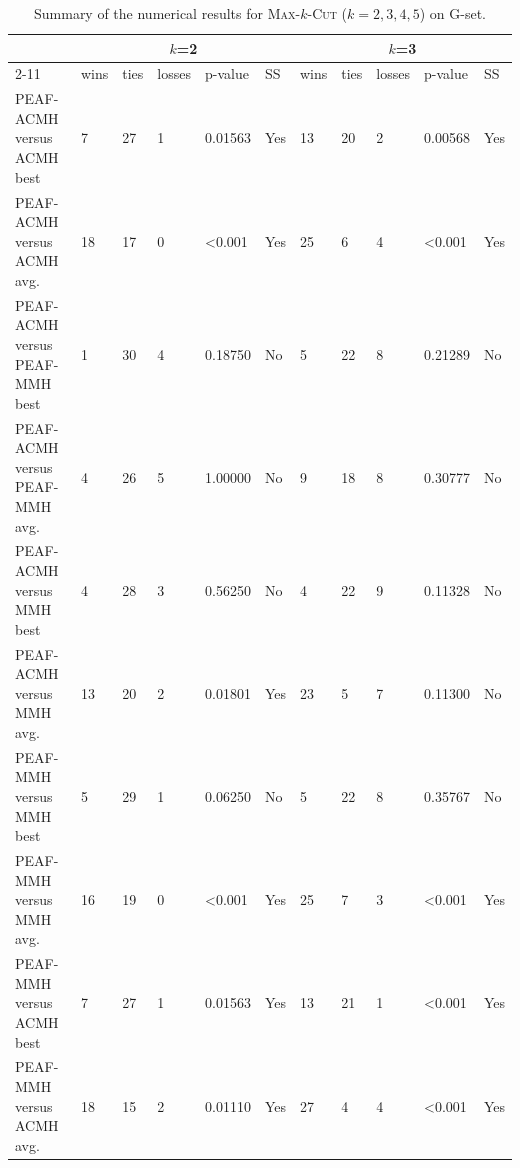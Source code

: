 \documentclass[12pt, a4paper]{article}%
\renewcommand{\arraystretch}{1.3}
\numberwithin{equation}{section}
\theoremstyle{plain}
\begin{document}
				
				{
					\scriptsize
					\setlength{\tabcolsep}{10pt}
					\renewcommand{\arraystretch}{1.6}
					\begin{landscape}
						\begin{longtable}{|l|lllll|lllll|}
							\caption[Summary for \textsc{Max}-$k$-\textsc{Cut}]{Summary of the numerical results for \textsc{Max}-$k$-\textsc{Cut} ($k=2,3,4,5$) on G-set.}
							\label{tab::maxcut-summary}\\
							\hline
							\multicolumn{1}{|c|}{\multirow{2}{*}{}} & \multicolumn{5}{c|}{$k$=2}                    & \multicolumn{5}{c|}{$k$=3}                    \\ \cline{2-11} 
							\multicolumn{1}{|c|}{}                  & wins & ties & losses & p-value          & SS  & wins & ties & losses & p-value          & SS  \\ \hline
							PEAF-ACMH versus ACMH best             & 7    & 27   & 1      & 0.01563          & Yes & 13   & 20   & 2      & 0.00568          & Yes \\
							PEAF-ACMH versus ACMH avg.             & 18   & 17   & 0      & \textless{}0.001 & Yes & 25   & 6    & 4      & \textless{}0.001 & Yes \\
							PEAF-ACMH versus PEAF-MMH best           & 1    & 30   & 4      & 0.18750          & No  & 5    & 22   & 8      & 0.21289          & No  \\
							PEAF-ACMH versus PEAF-MMH avg.           & 4    & 26   & 5      & 1.00000          & No  & 9    & 18   & 8      & 0.30777          & No  \\
							PEAF-ACMH versus MMH best               & 4    & 28   & 3      & 0.56250          & No  & 4    & 22   & 9      & 0.11328          & No  \\
							PEAF-ACMH versus MMH avg.               & 13   & 20   & 2      & 0.01801          & Yes & 23   & 5    & 7      & 0.11300          & No  \\
							PEAF-MMH versus MMH best                 & 5    & 29   & 1      & 0.06250          & No  & 5    & 22   & 8      & 0.35767          & No  \\
							PEAF-MMH versus MMH avg.                 & 16   & 19   & 0      & \textless{}0.001 & Yes & 25   & 7    & 3      & \textless{}0.001 & Yes \\
							PEAF-MMH versus ACMH best               & 7    & 27   & 1      & 0.01563          & Yes & 13   & 21   & 1      & \textless{}0.001 & Yes \\
							PEAF-MMH versus ACMH avg.               & 18   & 15   & 2      & 0.01110          & Yes & 27   & 4    & 4      & \textless{}0.001 & Yes \\

\end{longtable}
\end{landscape}}
\end{document}
